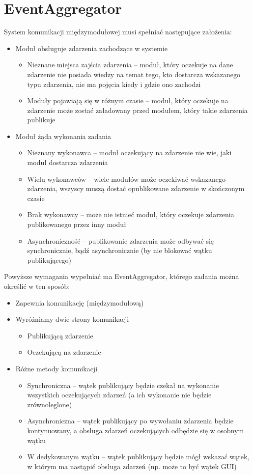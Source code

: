 \section{EventAggregator}
System komunikacji międzymodułowej musi spełniać następujące założenia:
\begin{itemize}
 \item Moduł obsługuje zdarzenia zachodzące w systemie \begin{itemize}
  \item Nieznane miejsca zajścia zdarzenia -- moduł, który oczekuje na dane zdarzenie nie posiada wiedzy na temat tego, kto dostarcza wskazanego typu zdarzenia, nie ma pojęcia kiedy i gdzie ono zachodzi
  \item Moduły pojawiają się w różnym czasie -- moduł, który oczekuje na zdarzenie może zostać załadowany przed modułem, który takie zdarzenia publikuje
 \end{itemize}
 \item Moduł żąda wykonania zadania \begin{itemize}
  \item Nieznany wykonawca -- moduł oczekujący na zdarzenie nie wie, jaki moduł dostarcza zdarzenia
  \item Wielu wykonawców -- wiele modułów może oczekiwać wskazanego zdarzenia, wszyscy muszą dostać opublikowane zdarzenie w skończonym czasie
  \item Brak wykonawcy -- może nie istnieć moduł, który oczekuje zdarzenia publikowanego przez inny moduł
  \item Asynchroniczność -- publikowanie zdarzenia może odbywać się synchronicznie, bądź asynchronicznie (by nie blokować wątku publikującego)
 \end{itemize}
\end{itemize}

Powyższe wymagania wypełniać ma EventAggregator, którego zadania można określić w ten sposób:
\begin{itemize}
 \item Zapewnia komunikację (międzymodułową)
 \item Wyróżniamy dwie strony komunikacji \begin{itemize}
  \item Publikującą zdarzenie
  \item Oczekującą na zdarzenie
  \end{itemize}
 \item Różne metody komunikacji \begin{itemize}
  \item Synchroniczna -- wątek publikujący będzie czekał na wykonanie wszystkich oczekujących zdarzeń (a ich wykonanie nie będzie zrównoleglone)
  \item Asynchroniczna -- wątek publikujący po wywołaniu zdarzenia będzie kontynuowany, a obsługa zdarzeń oczekujących odbędzie się w osobnym wątku
  \item W dedykowanym wątku -- wątek publikujący będzie mógł wskazać wątek, w którym ma nastąpić obsługa zdarzeń (np. może to być wątek GUI)
 \end{itemize}
\end{itemize}

